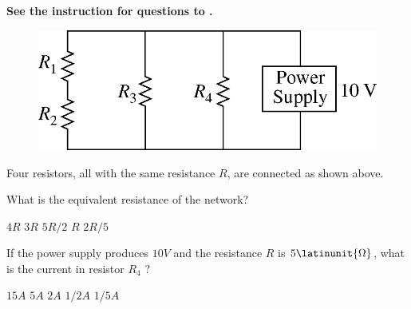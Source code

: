 \textbf{See the instruction for questions  to .}

\begin{figure}[H]
\centering
\includegraphics[scale=0.25]{images/img-003-008.png}
\end{figure}

Four resistors, all with the same resistance $R$, are connected as shown above.

\begin{questions}\setcounter{question}{3}\question
What is the equivalent resistance of the network?

\begin{oneparchoices}
\choice $4 R$
\choice $3 R$
\choice $5 R / 2$
\choice $R$
\choice $2 R / 5$
\end{oneparchoices}\end{questions}

\begin{questions}\setcounter{question}{4}\question
If the power supply produces $10 \unit{V}$ and the resistance $R$ is $5\latinunit{\Omega}$, what is the current in resistor $R_{4}$ ?

\begin{oneparchoices}
\choice $15    \unit{A}$
\choice $5     \unit{A}$
\choice $2     \unit{A}$
\choice $1 / 2 \unit{A}$
\choice $1 / 5 \unit{A}$
\end{oneparchoices}\end{questions}

